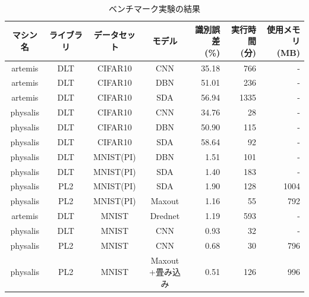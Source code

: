 \begin{table}[htbp]
  \centering
  \caption{ベンチマーク実験の結果}
    \begin{tabular}{|c|c|c|c|r|r|r|}\hline
    マシン名 & ライブラリ & データセット & モデル & \shortstack{識別誤差\\(\%)} & \shortstack{実行時間\\(分)} & \shortstack{使用メモリ\\(MB)}\rule[0mm]{0mm}{10mm}\\ \hline
artemis & DLT & CIFAR10 & CNN   & 35.18 & 766   & - \\ \hline
artemis & DLT & CIFAR10 & DBN & 51.01 & 236 &- \\ \hline
artemis & DLT & CIFAR10 & SDA & 56.94 & 1335&- \\ \hline
physalis & DLT & CIFAR10 & CNN & 34.76 & 28&- \\ \hline
physalis & DLT & CIFAR10 & DBN & 50.90& 115 &- \\ \hline
physalis & DLT & CIFAR10 & SDA & 58.64 & 92&- \\ \hline
physalis & DLT & MNIST(PI) & DBN & 1.51& 101 &- \\ \hline
physalis & DLT & MNIST(PI) & SDA & 1.40 & 183 &- \\ \hline
physalis & PL2 & MNIST(PI) & SDA & 1.90 & 128 & 1004 \\ \hline
physalis & PL2 & MNIST(PI) & Maxout & 1.16& 55& 792 \\ \hline
artemis & DLT & MNIST & Drednet & 1.19& 593 &- \\ \hline
physalis & DLT & MNIST & CNN & 0.93& 32&- \\ \hline
physalis & PL2 & MNIST & CNN & 0.68& 30& 796 \\ \hline
physalis & PL2 & MNIST & \shortstack{Maxout\\+畳み込み}\rule[0mm]{0mm}{8mm} & 0.51& 126 & 996 \\ \hline
\end{tabular}%
\label{c5_all_result}%
\end{table}%
\par

